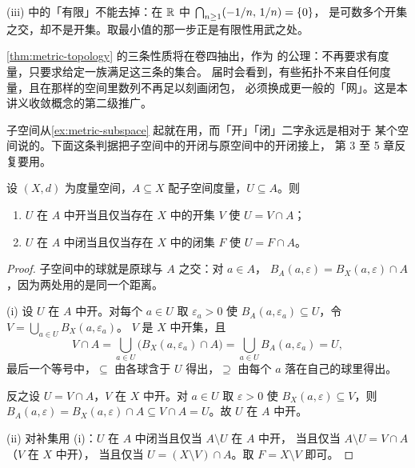 \begin{remark}
  (iii) 中的「有限」不能去掉：在 \(\mathbb{R}\) 中 \(\bigcap_{n \ge 1}(-1/n,\,1/n) = \left\{0\right\}\)，
  是可数多个开集之交，却不是开集。取最小值的那一步正是有限性用武之处。

  \cref{thm:metric-topology} 的三条性质将在卷四抽出，作为
  的公理：不再要求有度量，只要求给定一族满足这三条的集合。
  届时会看到，有些拓扑不来自任何度量，且在那样的空间里数列不再足以刻画闭包，
  必须换成更一般的「网」。这是本讲义收敛概念的第二级推广。
\end{remark}

子空间从\cref{ex:metric-subspace} 起就在用，而「开」「闭」二字永远是相对于
某个空间说的。下面这条判据把子空间中的开闭与原空间中的开闭接上，
第 3 至 5 章反复要用。

\begin{lemma}[相对开闭判据]
  \label{lem:subspace-openclosed}
  设 \((X,d)\) 为度量空间，\(A \subseteq X\) 配子空间度量，\(U \subseteq A\)。则
  \begin{enumerate}[label=(\roman*)]
    \item \(U\) 在 \(A\) 中开当且仅当存在 \(X\) 中的开集 \(V\) 使 \(U = V \cap A\)；
    \item \(U\) 在 \(A\) 中闭当且仅当存在 \(X\) 中的闭集 \(F\) 使 \(U = F \cap A\)。
  \end{enumerate}
\end{lemma}

\begin{proof}
  子空间中的球就是原球与 \(A\) 之交：对 \(a \in A\)，
  \(B_{A}(a,\varepsilon) = B_{X}(a,\varepsilon) \cap A\)，因为两处用的是同一个距离。

  (i) 设 \(U\) 在 \(A\) 中开。对每个 \(a \in U\) 取 \(\varepsilon_{a}>0\) 使
  \(B_{A}(a,\varepsilon_{a}) \subseteq U\)，令 \(V = \bigcup_{a \in U} B_{X}(a,\varepsilon_{a})\)。
  \(V\) 是 \(X\) 中开集，且
  \[
    V \cap A = \bigcup_{a \in U} \bigl(B_{X}(a,\varepsilon_{a}) \cap A\bigr)
             = \bigcup_{a \in U} B_{A}(a,\varepsilon_{a}) = U ,
  \]
  最后一个等号中，\(\subseteq\) 由各球含于 \(U\) 得出，\(\supseteq\) 由每个 \(a\) 落在自己的球里得出。

  反之设 \(U = V \cap A\)，\(V\) 在 \(X\) 中开。对 \(a \in U\) 取 \(\varepsilon>0\) 使
  \(B_{X}(a,\varepsilon) \subseteq V\)，则 \(B_{A}(a,\varepsilon) = B_{X}(a,\varepsilon) \cap A
  \subseteq V \cap A = U\)。故 \(U\) 在 \(A\) 中开。

  (ii) 对补集用 (i)：\(U\) 在 \(A\) 中闭当且仅当 \(A \setminus U\) 在 \(A\) 中开，
  当且仅当 \(A \setminus U = V \cap A\)（\(V\) 在 \(X\) 中开），
  当且仅当 \(U = (X \setminus V) \cap A\)。取 \(F = X \setminus V\) 即可。
\end{proof}

